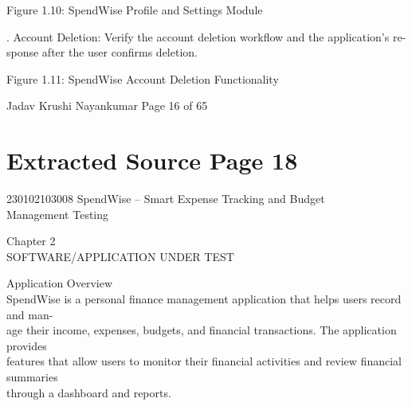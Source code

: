 \documentclass[12pt,a4paper]{report}
\begin{document}
\smallskip

\smallskip

\smallskip

\smallskip
Figure 1.10: SpendWise Profile and Settings Module\\ 

\smallskip

. Account Deletion: Verify the account deletion workflow and the application’s re-\\ 
sponse after the user confirms deletion.\\ 

\smallskip

\smallskip

\smallskip

\smallskip
Figure 1.11: SpendWise Account Deletion Functionality\\ 

\smallskip

\smallskip

\smallskip
Jadav Krushi Nayankumar                                                  Page 16 of 65\\ 

\clearpage
\section*{Extracted Source Page 18}
230102103008                             SpendWise – Smart Expense Tracking and Budget\\ 
Management Testing\\ 

\smallskip

\smallskip

\smallskip
Chapter 2\\ 

\smallskip
SOFTWARE/APPLICATION UNDER TEST\\ 

\smallskip

 Application Overview\\ 

\smallskip
SpendWise is a personal finance management application that helps users record and man-\\ 
age their income, expenses, budgets, and financial transactions. The application provides\\ 
features that allow users to monitor their financial activities and review financial summaries\\ 
through a dashboard and reports.\\ 
\end{document}

